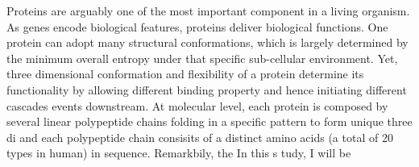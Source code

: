 Proteins are arguably one of the most important component in a living organism. As genes encode biological features, proteins deliver biological functions. One protein can adopt many structural conformations, which is largely determined by the minimum overall entropy under that specific sub-cellular environment. Yet, three dimensional conformation and flexibility of a protein determine its functionality by allowing different binding property and hence initiating different cascades events downstream. At molecular level, each protein is composed by several linear polypeptide chains folding in a specific pattern to form unique three di and each polypeptide chain consisits of a distinct amino acids (a total of 20 types in human) in sequence. Remarkbily, the  In this s tudy, I will be 
